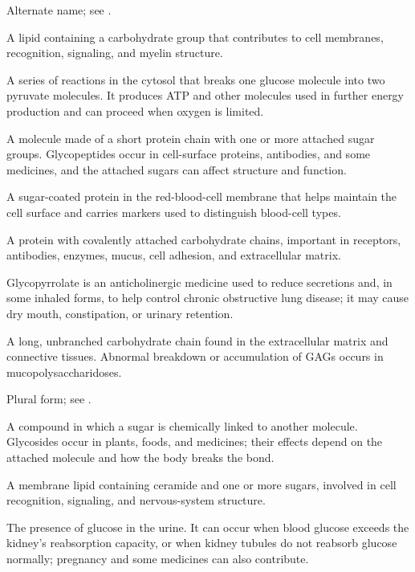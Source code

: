  Alternate name; see .

 A lipid containing a carbohydrate group that contributes to cell membranes, recognition, signaling, and myelin structure.

 A series of reactions in the cytosol that breaks one glucose molecule into two pyruvate molecules. It produces ATP and other molecules used in further energy production and can proceed when oxygen is limited.

 A molecule made of a short protein chain with one or more attached sugar groups. Glycopeptides occur in cell-surface proteins, antibodies, and some medicines, and the attached sugars can affect structure and function.

 A sugar-coated protein in the red-blood-cell membrane that helps maintain the cell surface and carries markers used to distinguish blood-cell types.

 A protein with covalently attached carbohydrate chains, important in receptors, antibodies, enzymes, mucus, cell adhesion, and extracellular matrix.

 Glycopyrrolate is an anticholinergic medicine used to reduce secretions and, in some inhaled forms, to help control chronic obstructive lung disease; it may cause dry mouth, constipation, or urinary retention.

 A long, unbranched carbohydrate chain found in the extracellular matrix and connective tissues. Abnormal breakdown or accumulation of GAGs occurs in mucopolysaccharidoses.

 Plural form; see .

 A compound in which a sugar is chemically linked to another molecule. Glycosides occur in plants, foods, and medicines; their effects depend on the attached molecule and how the body breaks the bond.

 A membrane lipid containing ceramide and one or more sugars, involved in cell recognition, signaling, and nervous-system structure.

 The presence of glucose in the urine. It can occur when blood glucose exceeds the kidney’s reabsorption capacity, or when kidney tubules do not reabsorb glucose normally; pregnancy and some medicines can also contribute.


